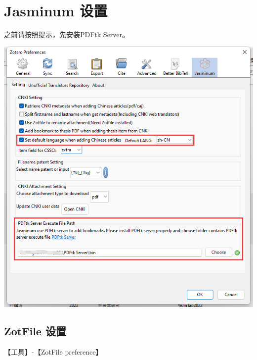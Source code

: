 \documentclass[
  letterpaper,
  DIV=11,
  numbers=noendperiod,
  oneside]{scrreprt}
\begin{document}
\hypertarget{sec-zotero-jasminum}{%
\section{Jasminum 设置}\label{sec-zotero-jasminum}}

之前请按照提示，先安装PDFtk Server。

\includegraphics{./images/zotero_jasminum.png}

\hypertarget{zotfile-ux8bbeux7f6e}{%
\subsection{ZotFile 设置}\label{zotfile-ux8bbeux7f6e}}

【工具】-【ZotFile preference】
\end{document}
